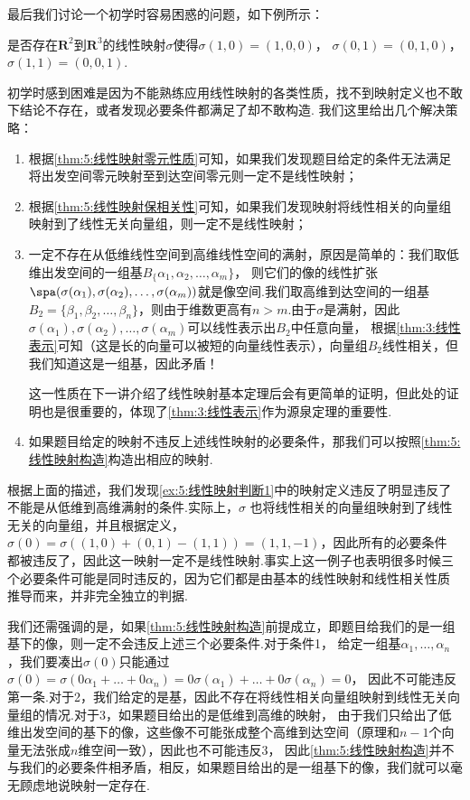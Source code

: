 最后我们讨论一个初学时容易困惑的问题，如下例所示：
\begin{example}\label{ex:5:线性映射判断1}
    是否存在$\mathbf{R}^2$到$\mathbf{R}^3$的线性映射$\sigma$使得$\sigma(1,0)=(1,0,0)$，
	$\sigma(0,1)=(0,1,0)$，$\sigma(1,1)=(0,0,1)$.
\end{example}

初学时感到困难是因为不能熟练应用线性映射的各类性质，找不到映射定义也不敢下结论不存在，或者发现必要条件都满足了却不敢构造.
我们这里给出几个解决策略：
\begin{enumerate}
    \item 根据\autoref{thm:5:线性映射零元性质}可知，如果我们发现题目给定的条件无法满足将出发空间零元映射至到达空间零元则一定不是线性映射；
    \item 根据\autoref{thm:5:线性映射保相关性}可知，如果我们发现映射将线性相关的向量组映射到了线性无关向量组，则一定不是线性映射；
    \item 一定不存在从低维线性空间到高维线性空间的满射，原因是简单的：我们取低维出发空间的一组基$B_\{\alpha_1,\alpha_2,\ldots,\alpha_m\}$，
    则它们的像的线性扩张$\spa(\sigma(\alpha_1),\sigma(\alpha_2),\ldots,\sigma(\alpha_m))$就是像空间.我们取高维到达空间的一组基
    $B_2=\{\beta_1,\beta_2,\ldots,\beta_n\}$，则由于维数更高有$n>m$.由于$\sigma$是满射，因此
    $\sigma(\alpha_1),\sigma(\alpha_2),\ldots,\sigma(\alpha_m)$可以线性表示出$B_2$中任意向量，
    根据\autoref{thm:3:线性表示}可知（这是长的向量可以被短的向量线性表示），向量组$B_2$线性相关，但我们知道这是一组基，因此矛盾！

    这一性质在下一讲介绍了线性映射基本定理后会有更简单的证明，但此处的证明也是很重要的，体现了\autoref{thm:3:线性表示}作为源泉定理的重要性.

    \item 如果题目给定的映射不违反上述线性映射的必要条件，那我们可以按照\autoref{thm:5:线性映射构造}构造出相应的映射.
\end{enumerate}

根据上面的描述，我们发现\autoref{ex:5:线性映射判断1}中的映射定义违反了明显违反了不能是从低维到高维满射的条件.实际上，$\sigma$
也将线性相关的向量组映射到了线性无关的向量组，并且根据定义，$\sigma(0)=\sigma((1,0)+(0,1)-(1,1))=(1,1,-1)$，因此所有的必要条件
都被违反了，因此这一映射一定不是线性映射.事实上这一例子也表明很多时候三个必要条件可能是同时违反的，因为它们都是由基本的线性映射和线性相关性质
推导而来，并非完全独立的判据.

我们还需强调的是，如果\autoref{thm:5:线性映射构造}前提成立，即题目给我们的是一组基下的像，则一定不会违反上述三个必要条件.对于条件1，
给定一组基$\alpha_1,\ldots,\alpha_n$，我们要凑出$\sigma(0)$只能通过$\sigma(0)=\sigma(0\alpha_1+\ldots+0\alpha_n)=0\sigma(\alpha_1)+\ldots+0\sigma(\alpha_n)=0$，
因此不可能违反第一条.对于2，我们给定的是基，因此不存在将线性相关向量组映射到线性无关向量组的情况.对于3，如果题目给出的是低维到高维的映射，
由于我们只给出了低维出发空间的基下的像，这些像不可能张成整个高维到达空间（原理和$n-1$个向量无法张成$n$维空间一致），因此也不可能违反3，
因此\autoref{thm:5:线性映射构造}并不与我们的必要条件相矛盾，相反，如果题目给出的是一组基下的像，我们就可以毫无顾虑地说映射一定存在.

